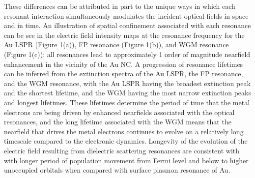 \documentclass[journal=jpclcd,manuscript=letter]{achemso}
\begin{document}
These differences can be attributed in part to the unique ways in which each resonant interaction simultaneously modulates the incident optical
fields in space and in time. An illustration of spatial confinement associated with each resonance can be see in the
electric field intensity maps at the resonance frequency for the
Au LSPR (Figure 1(a)), FP resonance (Figure 1(b)), and WGM resonance (Figure 1(c)); all resonances lead to approximately 1 order of
magnitude nearfield enhancement in the vicinity of the Au NC.
A progression of resonance lifetimes can be inferred from the extinction spectra of the Au LSPR, the FP resonance, and the WGM resonance, with
the Au LSPR having the broadest extinction peak and the shortest lifetime, and the WGM having the most narrow extinction peaks and longest lifetimes.  These
lifetimes determine the period of time that the metal electrons are being driven by enhanced nearfields associated with the optical resonances, and
the long lifetime associated with the WGM means that the nearfield that drives the metal electrons continues to evolve on a relatively long timescale compared
to the electronic dynamics.
Longevity of the evolution of the electric field resulting from dielectric scattering resonances are consistent with
with longer period of population movement from Fermi level and below to higher unoccupied orbitals when compared with surface plasmon
resonance of Au.
\end{document}
